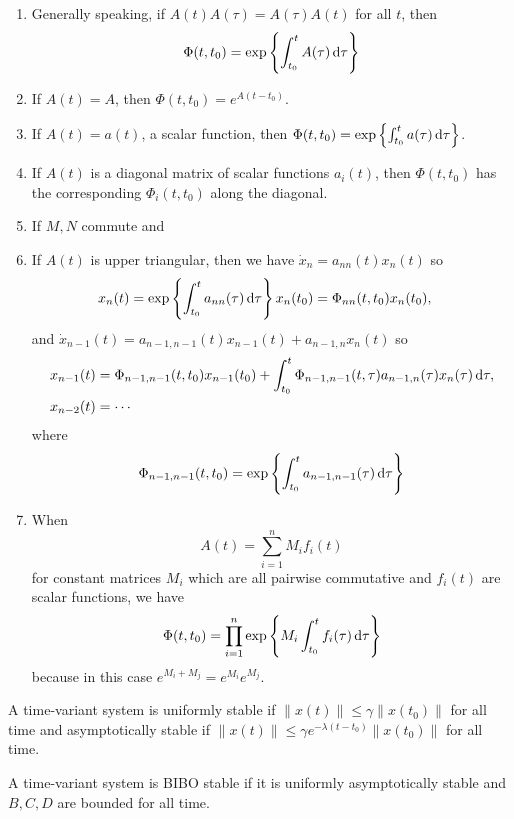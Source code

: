 \documentclass{report}
\begin{document}
\begin{enumerate}
  \item{
    Generally speaking, if $A(t)A(\tau) = A(\tau)A(t)$ for all $t$,
    then
    $$
    \Phi(t, t_0) =
    \exp\left\{
      \int_{t_0}^t A(\tau) \dif \tau
    \right\}
    $$
  }
  \item{
    If $A(t) = A$, then $\Phi(t, t_0) = e^{A(t - t_0)}$.
  }
  \item{
    If $A(t) = a(t)$, a scalar function, then
    $\Phi(t, t_0) = \exp\left\{\int_{t_0}^{t} a(\tau) \dif \tau\right\}$.
  }
  \item{
    If $A(t)$ is a diagonal matrix of scalar functions $a_i(t)$, then
    $\Phi(t,t_0)$ has the corresponding $\Phi_i(t, t_0)$ along the diagonal.
  }
  \item{
    If $M, N$ commute and
  }
  \item{
    If $A(t)$ is upper triangular, then we have
    $\dot{x}_n = a_{nn}(t) x_n(t)$ so
    \begin{align*}
      x_n(t) &=
        \exp\left\{\int_{t_0}^t a_{nn}(\tau) \dif\tau\right\} x_n(t_0) =
               \Phi_{nn}(t, t_0) x_n(t_0),
    \end{align*}
    and
    $\dot{x}_{n-1}(t) = a_{n-1,n-1}(t)x_{n-1}(t) +  a_{n-1,n}x_n(t)$
    so
    \begin{align*}
    x_{n-1}(t)
    &=  \Phi_{n-1, n-1}(t, t_0) x_{n-1}(t_0)
     + \int_{t_0}^t \Phi_{n-1,n-1}(t, \tau)
                   a_{n-1,n}(\tau)
                   x_n(\tau) \dif \tau, \\
    x_{n-2}(t)
    &= \cdots
    \end{align*}
    where
    $$
    \Phi_{n-1,n-1}(t, t_0) =
    \exp\left\{
      \int_{t_0}^t a_{n-1,n-1}(\tau) \dif\tau
    \right\}
    $$
  }
  \item{
    When
    $$
    A(t) = \sum_{i=1}^n M_i f_i(t)
    $$
    for constant matrices $M_i$ which are all pairwise commutative and
    $f_i(t)$ are scalar functions, we have
    $$
    \Phi(t, t_0) =
    \prod_{i=1}^n
    \exp\left\{
      M_i \int_{t_0}^t f_i(\tau) \dif\tau
    \right\}
    $$
    because in this case $e^{M_i + M_j} = e^{M_i}e^{M_j}$.
  }
\end{enumerate}

A time-variant system is uniformly stable if
$\| x(t) \| \leq \gamma \| x(t_0) \|$ for all time and asymptotically
stable if
$\| x(t) \| \leq \gamma e^{-\lambda(t - t_0)} \| x(t_0) \|$ for all time.

A time-variant system is BIBO stable if it is uniformly asymptotically
stable and $B, C, D$ are bounded for all time.
\end{document}
